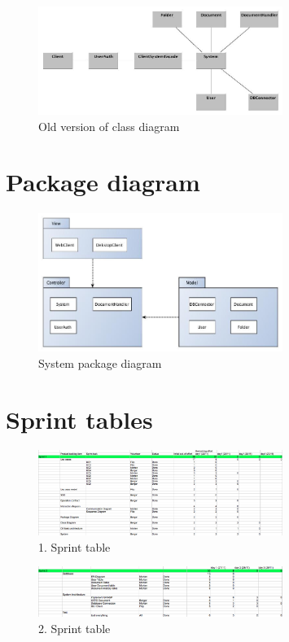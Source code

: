 \documentclass[11pt,a4paper]{article}
\begin{document}
\begin{figure}[H]
  		\centering
    	\includegraphics[width=300px]{images/ClassDiagramFirstDraft.jpg}
    	\caption{Old version of class diagram}
\end{figure}

\section{Package diagram}
\begin{figure}[H]
  		\centering
    	\includegraphics[width=300px]{images/PackageDiagramOverview.jpg}
    	\caption{System package diagram}
\end{figure}

\section{Sprint tables}

\begin{figure}[H]
  		\centering
    	\includegraphics[width=300px]{images/Sprint1_Table.png}
    	\caption{1. Sprint table}
\end{figure}

\begin{figure}[H]
  		\centering
    	\includegraphics[width=300px]{images/Sprint2_Table.png}
    	\caption{2. Sprint table}
\end{figure}
\end{document}
